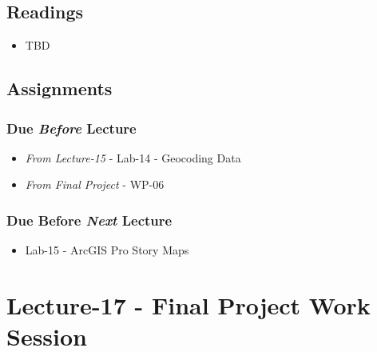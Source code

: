 \documentclass[]{book}
\providecommand{\tightlist}{%
  \setlength{\itemsep}{0pt}\setlength{\parskip}{0pt}}
\begin{document}
\hypertarget{readings-16}{%
\subsection*{Readings}\label{readings-16}}

\begin{itemize}
\tightlist
\item
  TBD
\end{itemize}

\hypertarget{assignments-17}{%
\subsection*{Assignments}\label{assignments-17}}

\hypertarget{due-before-lecture-15}{%
\subsubsection*{\texorpdfstring{Due \emph{Before} Lecture}{Due Before Lecture}}\label{due-before-lecture-15}}

\begin{itemize}
\tightlist
\item
  \emph{From Lecture-15} - Lab-14 - Geocoding Data
\item
  \emph{From Final Project} - WP-06
\end{itemize}

\hypertarget{due-before-next-lecture-14}{%
\subsubsection*{\texorpdfstring{Due Before \emph{Next} Lecture}{Due Before Next Lecture}}\label{due-before-next-lecture-14}}

\begin{itemize}
\tightlist
\item
  Lab-15 - ArcGIS Pro Story Maps
\end{itemize}

\hypertarget{lecture-17---final-project-work-session}{%
\section*{Lecture-17 - Final Project Work Session}\label{lecture-17---final-project-work-session}}
\end{document}

